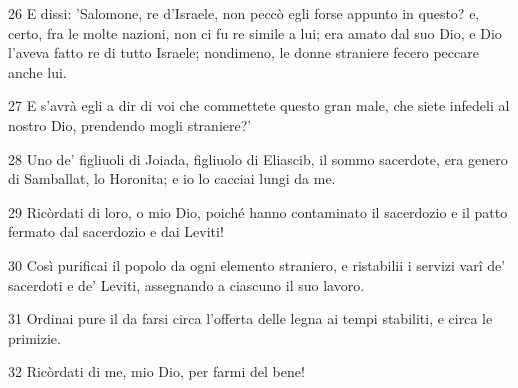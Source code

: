 \par 26 E dissi: 'Salomone, re d'Israele, non peccò egli forse appunto in questo? e, certo, fra le molte nazioni, non ci fu re simile a lui; era amato dal suo Dio, e Dio l'aveva fatto re di tutto Israele; nondimeno, le donne straniere fecero peccare anche lui.
\par 27 E s'avrà egli a dir di voi che commettete questo gran male, che siete infedeli al nostro Dio, prendendo mogli straniere?'
\par 28 Uno de' figliuoli di Joiada, figliuolo di Eliascib, il sommo sacerdote, era genero di Samballat, lo Horonita; e io lo cacciai lungi da me.
\par 29 Ricòrdati di loro, o mio Dio, poiché hanno contaminato il sacerdozio e il patto fermato dal sacerdozio e dai Leviti!
\par 30 Così purificai il popolo da ogni elemento straniero, e ristabilii i servizi varî de' sacerdoti e de' Leviti, assegnando a ciascuno il suo lavoro.
\par 31 Ordinai pure il da farsi circa l'offerta delle legna ai tempi stabiliti, e circa le primizie.
\par 32 Ricòrdati di me, mio Dio, per farmi del bene!


